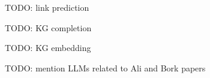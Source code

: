TODO: link prediction

TODO: KG completion

TODO: KG embedding

TODO: mention LLMs related to Ali and Bork papers

\cite{Ali2023}

\cite{Ali2024}

